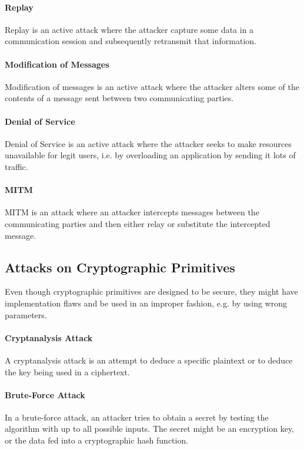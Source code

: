\documentclass[pdftex,english,10pt,b5paper,twoside]{book}
\begin{document}
\paragraph{Replay} Replay is an active attack where the attacker capture some
data in a communication session and subsequently retransmit that information.

\paragraph{Modification of Messages} Modification of messages is an active
attack where the attacker alters some of the contents of a message sent between
two communicating parties.

\paragraph{Denial of Service} Denial of Service is an active attack where the
attacker seeks to make resources unavailable for legit users, i.e. by
overloading an application by sending it lots of traffic.

\paragraph{\acl{MITM}} \ac{MITM} is an attack where an attacker intercepts messages
between the communicating parties and then either relay or substitute the
intercepted message.

\subsection{Attacks on Cryptographic Primitives}

Even though cryptographic primitives are designed to be secure, they might have
implementation flaws and be used in an improper fashion, e.g. by using wrong
parameters.

\paragraph{Cryptanalysis Attack} A cryptanalysis attack is an attempt to deduce
a specific plaintext or to deduce the key being used in a ciphertext.

\paragraph{Brute-Force Attack} In a brute-force attack, an attacker tries
to obtain a secret by testing the algorithm with up to all possible inputs. The
secret might be an encryption key, or the data fed into a cryptographic hash
function.
\end{document}
